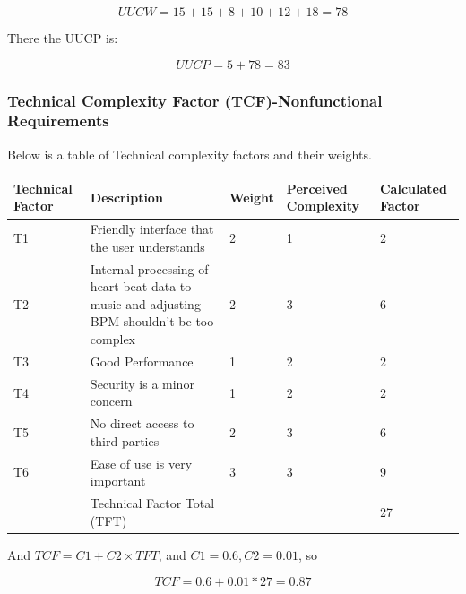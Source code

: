 \documentclass[letterpaper,english, 12pt]{scrreprt}
\begin{document}
\begin{equation}
UUCW = 15 + 15 + 8 + 10 + 12 + 18 = 78
\end{equation}

There the UUCP is:

\begin{equation}
UUCP = 5 + 78 = 83
\end{equation}

\subsubsection{Technical Complexity Factor (TCF)-Nonfunctional Requirements}

Below is a table of Technical complexity factors and their weights.

\begin{center}
        \begin{tabular}{|C{2cm}|C{5cm}|C{1.5cm}|C{2cm}|C{2cm}|}
                \hline
                        Technical Factor & Description & Weight & Perceived Complexity & Calculated Factor \\
                \hline
                        T1 & Friendly interface that the user understands & 2 & 1 & 2 \\
                \hline
                        T2 & Internal processing of heart beat data to music and adjusting BPM shouldn't be too complex & 2 & 3 & 6\\
                \hline
                        T3 & Good Performance & 1 & 2 & 2 \\
                \hline
                        T4 & Security is a minor concern & 1 & 2 & 2 \\
                \hline
                        T5 & No direct access to third parties & 2 & 3 & 6 \\
                \hline
                        T6 & Ease of use is very important & 3 & 3 & 9\\
                \hline   
                        & Technical Factor Total (TFT) & & & 27 \\
                \hline
        \end{tabular}
\end{center}

And $TCF = C1 + C2 \times TFT$, and $C1 = 0.6, C2 = 0.01$, so

\begin{equation}
TCF = 0.6 + 0.01*27 = 0.87
\end{equation}
\end{document}
